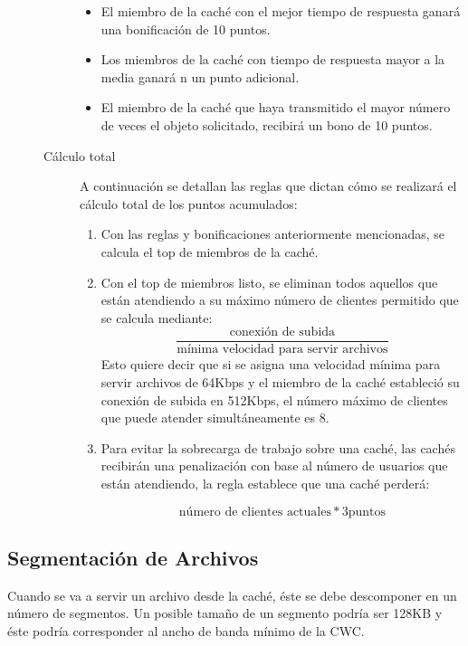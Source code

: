 \begin{description}
\begin{description}
		\begin{itemize}
		\item El miembro de la caché con el mejor tiempo de respuesta ganará una bonificación de 10 puntos.
		\item Los miembros de la caché con tiempo de respuesta mayor a la media ganará	n un punto adicional.
		\item El miembro de la caché que haya transmitido el mayor número de veces el  objeto solicitado, recibirá un bono de 10 puntos.
		\end{itemize}

	\item[Cálculo total] A continuación se detallan las reglas que dictan cómo se realizará el cálculo total de los puntos acumulados: 
	
		\begin{enumerate}
		\item Con las reglas y bonificaciones anteriormente mencionadas, se calcula el top de miembros de la caché.
		\item Con el top de miembros listo, se eliminan todos aquellos que están atendiendo a su máximo número de clientes permitido que se calcula mediante: 
		$$ \frac {\text{conexión de subida}}{\text{mínima velocidad para servir archivos}} $$ 
		Esto quiere decir que si se asigna una velocidad mínima para servir archivos de 64Kbps y el miembro de la caché estableció su conexión de subida en 512Kbps, el número máximo de clientes que puede atender simultáneamente es 8.
		\item Para evitar la sobrecarga de trabajo sobre una caché, las cachés recibirán una penalización con base al número de usuarios que están atendiendo, la regla establece que una caché perderá: 
		
		$$ \text{número de clientes actuales} * 3 \text{puntos} $$
		\end{enumerate}
	
	\end{description}

\end{description}


\subsection{Segmentación de Archivos}

Cuando se va a servir un archivo desde la caché, éste se debe descomponer en un número de segmentos. Un posible tamaño de un segmento podría ser 128KB y éste podría corresponder al ancho de banda mínimo de la CWC. 

